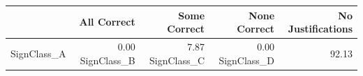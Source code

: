 \begin{tabular}{lrrrr}
\toprule
 & All Correct & Some Correct & None Correct & No Justifications \\
\midrule
SignClass_A & 0.00%
SignClass_B & 7.87%
SignClass_C & 0.00%
SignClass_D & 92.13%
\bottomrule
\end{tabular}
